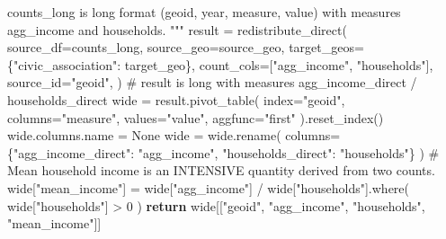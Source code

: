 \documentclass[
  letterpaper,
  DIV=11,
  numbers=noendperiod]{scrreprt}
\newenvironment{Shaded}{\begin{snugshade}}{\end{snugshade}}
\newcommand{\CommentTok}[1]{\textcolor[rgb]{0.37,0.37,0.37}{#1}}
\newcommand{\ControlFlowTok}[1]{\textcolor[rgb]{0.00,0.23,0.31}{\textbf{#1}}}
\newcommand{\DecValTok}[1]{\textcolor[rgb]{0.68,0.00,0.00}{#1}}
\newcommand{\NormalTok}[1]{\textcolor[rgb]{0.00,0.23,0.31}{#1}}
\newcommand{\OperatorTok}[1]{\textcolor[rgb]{0.37,0.37,0.37}{#1}}
\newcommand{\StringTok}[1]{\textcolor[rgb]{0.13,0.47,0.30}{#1}}
\newcommand{\VariableTok}[1]{\textcolor[rgb]{0.07,0.07,0.07}{#1}}
\begin{document}
\begin{Shaded}
\begin{Highlighting}[]
\CommentTok{    \textasciigrave{}\textasciigrave{}counts\_long\textasciigrave{}\textasciigrave{} is long format (geoid, year, measure, value) with measures}
\CommentTok{    \textasciigrave{}\textasciigrave{}agg\_income\textasciigrave{}\textasciigrave{} and \textasciigrave{}\textasciigrave{}households\textasciigrave{}\textasciigrave{}.}
\CommentTok{    """}
\NormalTok{    result }\OperatorTok{=}\NormalTok{ redistribute\_direct(}
\NormalTok{        source\_df}\OperatorTok{=}\NormalTok{counts\_long,}
\NormalTok{        source\_geo}\OperatorTok{=}\NormalTok{source\_geo,}
\NormalTok{        target\_geos}\OperatorTok{=}\NormalTok{\{}\StringTok{"civic\_association"}\NormalTok{: target\_geo\},}
\NormalTok{        count\_cols}\OperatorTok{=}\NormalTok{[}\StringTok{"agg\_income"}\NormalTok{, }\StringTok{"households"}\NormalTok{],}
\NormalTok{        source\_id}\OperatorTok{=}\StringTok{"geoid"}\NormalTok{,}
\NormalTok{    )}
    \CommentTok{\# result is long with measures agg\_income\_direct / households\_direct}
\NormalTok{    wide }\OperatorTok{=}\NormalTok{ result.pivot\_table(}
\NormalTok{        index}\OperatorTok{=}\StringTok{"geoid"}\NormalTok{, columns}\OperatorTok{=}\StringTok{"measure"}\NormalTok{, values}\OperatorTok{=}\StringTok{"value"}\NormalTok{, aggfunc}\OperatorTok{=}\StringTok{"first"}
\NormalTok{    ).reset\_index()}
\NormalTok{    wide.columns.name }\OperatorTok{=} \VariableTok{None}
\NormalTok{    wide }\OperatorTok{=}\NormalTok{ wide.rename(}
\NormalTok{        columns}\OperatorTok{=}\NormalTok{\{}\StringTok{"agg\_income\_direct"}\NormalTok{: }\StringTok{"agg\_income"}\NormalTok{, }\StringTok{"households\_direct"}\NormalTok{: }\StringTok{"households"}\NormalTok{\}}
\NormalTok{    )}
    \CommentTok{\# Mean household income is an INTENSIVE quantity derived from two counts.}
\NormalTok{    wide[}\StringTok{"mean\_income"}\NormalTok{] }\OperatorTok{=}\NormalTok{ wide[}\StringTok{"agg\_income"}\NormalTok{] }\OperatorTok{/}\NormalTok{ wide[}\StringTok{"households"}\NormalTok{].where(}
\NormalTok{        wide[}\StringTok{"households"}\NormalTok{] }\OperatorTok{\textgreater{}} \DecValTok{0}
\NormalTok{    )}
    \ControlFlowTok{return}\NormalTok{ wide[[}\StringTok{"geoid"}\NormalTok{, }\StringTok{"agg\_income"}\NormalTok{, }\StringTok{"households"}\NormalTok{, }\StringTok{"mean\_income"}\NormalTok{]]}



\end{Highlighting}
\end{Shaded}
\end{document}
